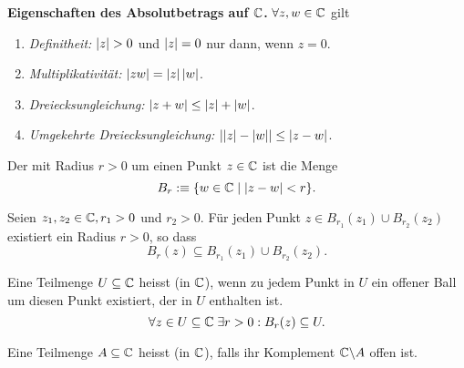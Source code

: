 \textbf{Eigenschaften des Absolutbetrags auf $\mathbb{C}$.}
$\forall z,w \in \mathbb{C}$ gilt
\begin{enumerate}
  \item \emph{Definitheit:} $\left|z\right| > 0$ und $\left|z\right|=0$ nur dann, wenn $z = 0$.
  \item \emph{Multiplikativität:} $\left|zw\right| = \left|z\right|\left|w\right|$.
  \item \emph{Dreiecksungleichung:} $\left|z+w\right| \leq \left|z\right| + \left|w\right|$.
  \item \emph{Umgekehrte Dreiecksungleichung:} $\left|\left|z\right|-\left|w\right|\right| \leq \left|z-w\right|$.
\end{enumerate}

\begin{mydef}
  Der  mit Radius $r > 0$ um einen Punkt $z \in \mathbb{C}$ ist die Menge
  \[
    B_r :\equiv \{ w \in \mathbb{C} \mid \left|z-w\right| <r \}.
  \]
\end{mydef}

\begin{imp-ex} Seien $z_1, z_2 \in \mathbb{C}, r_1 > 0$ und $r_2 > 0$. Für jeden Punkt $z \in B_{r_1}(z_1) \cup B_{r_2}(z_2)$ existiert ein Radius $r>0$, so dass
\[
  B_r(z) \subseteq B_{r_1}(z_1) \cup B_{r_2}(z_2).
\]
\end{imp-ex}

\begin{mydef} Eine Teilmenge $U \subseteq \mathbb{C}$ heisst  (in $\mathbb{C}$), wenn zu jedem Punkt in $U$ ein offener Ball um diesen Punkt existiert, der in $U$ enthalten ist.
\[
  \forall z \in U \subseteq \mathbb{C} \; \exists r>0: B_r(z) \subseteq U.
\]

Eine Teilmenge $A \subseteq \mathbb{C}$ heisst  (in $\mathbb{C}$), falls ihr Komplement $\mathbb{C} \backslash A$ offen ist.
\end{mydef}

